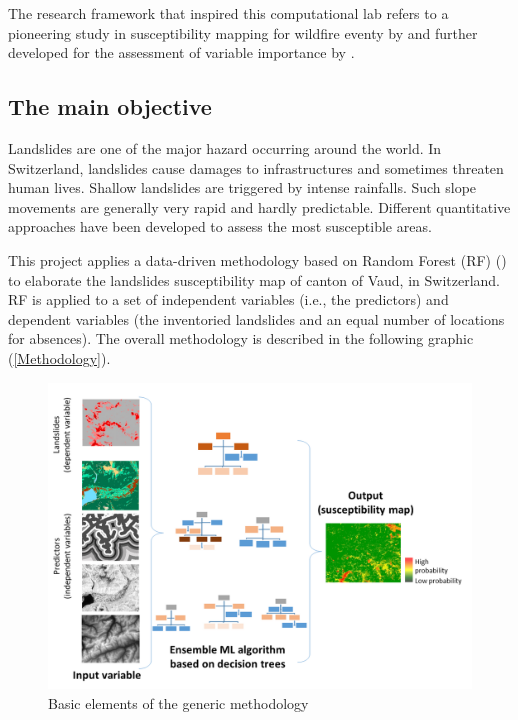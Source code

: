 \documentclass[
]{book}
\begin{document}
The research framework that inspired this computational lab refers to a pioneering study in susceptibility mapping for wildfire eventy by \citet{tonini_machine_2020} and further developed for the assessment of variable importance by \citet{trucchia_machine-learning_2022}.

\hypertarget{the-main-objective}{%
\subsection{The main objective}\label{the-main-objective}}

Landslides are one of the major hazard occurring around the world.
In Switzerland, landslides cause damages to infrastructures and sometimes threaten human lives.
Shallow landslides are triggered by intense rainfalls.
Such slope movements are generally very rapid and hardly predictable.
Different quantitative approaches have been developed to assess the most susceptible areas.

This project applies a data-driven methodology based on Random Forest (RF) (\citet{breiman_random_2001}) to elaborate the landslides susceptibility map of canton of Vaud, in Switzerland.
RF is applied to a set of independent variables (i.e., the predictors) and dependent variables (the inventoried landslides and an equal number of locations for absences).
The overall methodology is described in the following graphic (\autoref{Methodology}).

\begin{figure}

{\centering \includegraphics[width=0.8\linewidth,height=0.8\textheight]{images/Methodology} 

}

\caption{Basic elements of the generic methodology \label{Methodology}}\label{fig:gen-met}
\end{figure}
\end{document}
